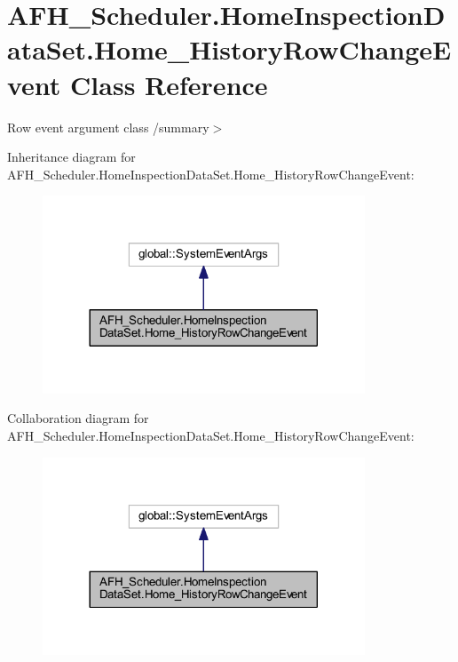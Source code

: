 \section{A\+F\+H\+\_\+\+Scheduler.\+Home\+Inspection\+Data\+Set.\+Home\+\_\+\+History\+Row\+Change\+Event Class Reference}
\label{class_a_f_h___scheduler_1_1_home_inspection_data_set_1_1_home___history_row_change_event}


Row event argument class /summary$>$  




Inheritance diagram for A\+F\+H\+\_\+\+Scheduler.\+Home\+Inspection\+Data\+Set.\+Home\+\_\+\+History\+Row\+Change\+Event\+:
\nopagebreak
\begin{figure}[H]
\begin{center}
\leavevmode
\includegraphics[width=272pt]{class_a_f_h___scheduler_1_1_home_inspection_data_set_1_1_home___history_row_change_event__inherit__graph}
\end{center}
\end{figure}


Collaboration diagram for A\+F\+H\+\_\+\+Scheduler.\+Home\+Inspection\+Data\+Set.\+Home\+\_\+\+History\+Row\+Change\+Event\+:
\nopagebreak
\begin{figure}[H]
\begin{center}
\leavevmode
\includegraphics[width=272pt]{class_a_f_h___scheduler_1_1_home_inspection_data_set_1_1_home___history_row_change_event__coll__graph}
\end{center}
\end{figure}
